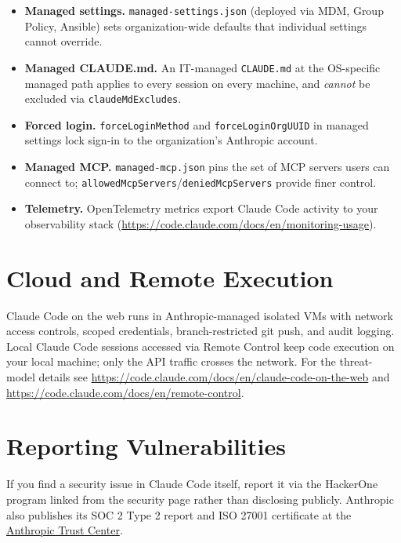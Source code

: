 \begin{itemize}
  \item \textbf{Managed settings.} \texttt{managed-settings.json}
        (deployed via MDM, Group Policy, Ansible) sets organization-wide
        defaults that individual settings cannot override.
  \item \textbf{Managed CLAUDE.md.} An IT-managed
        \texttt{CLAUDE.md} at the OS-specific managed path applies to
        every session on every machine, and \emph{cannot} be excluded
        via \texttt{claudeMdExcludes}.
  \item \textbf{Forced login.} \texttt{forceLoginMethod} and
        \texttt{forceLoginOrgUUID} in managed settings lock sign-in to
        the organization's Anthropic account.
  \item \textbf{Managed MCP.} \texttt{managed-mcp.json} pins the set of
        MCP servers users can connect to;
        \texttt{allowedMcpServers}/\texttt{deniedMcpServers} provide
        finer control.
  \item \textbf{Telemetry.} OpenTelemetry metrics export Claude Code
        activity to your observability stack
        (\url{https://code.claude.com/docs/en/monitoring-usage}).
\end{itemize}

\section{Cloud and Remote Execution}
\label{sec:cloud-security}

Claude Code on the web runs in Anthropic-managed isolated VMs with
network access controls, scoped credentials, branch-restricted git push,
and audit logging. Local Claude Code sessions accessed via Remote Control
keep code execution on your local machine; only the API traffic crosses
the network. For the threat-model details see
\url{https://code.claude.com/docs/en/claude-code-on-the-web} and
\url{https://code.claude.com/docs/en/remote-control}.

\section{Reporting Vulnerabilities}
\label{sec:reporting}

If you find a security issue in Claude Code itself, report it via the
HackerOne program linked from the security page rather than disclosing
publicly. Anthropic also publishes its SOC 2 Type 2 report and ISO 27001
certificate at the
\href{https://trust.anthropic.com}{Anthropic Trust Center}.

